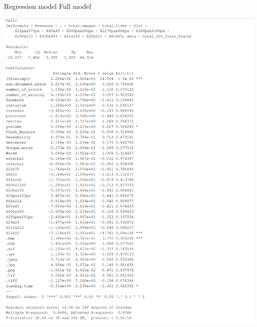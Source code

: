 \documentclass{book}
\begin{document}
\begin{table}[H]
\centering
\caption{Regression model Full model}\label{d :r :2}
\begin{center}
\includegraphics[scale=0.8]{../R/photos/69_full2.PNG}   \\
\end{center}
\end{table}
\end{document}

